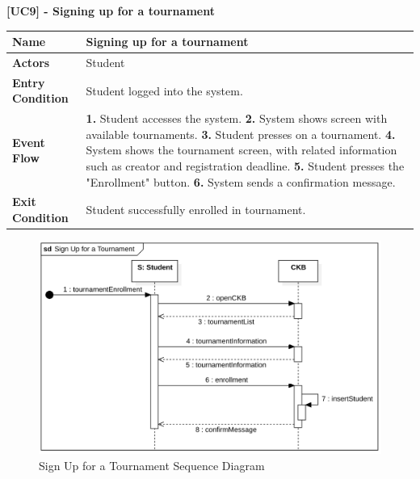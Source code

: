 \clearpage

\raggedright
\textbf{[UC9] - Signing up for a tournament}
\begin{table}[h]
\begin{tabular}{|l|p{12cm}|} \hline 

\rule[-3mm]{0mm}{1cm}
\textbf{Name} & Signing up for a tournament \\ \hline 

\rule[-3mm]{0mm}{1cm}
\textbf{Actors} & Student \\ \hline 

\rule[-3mm]{0mm}{1cm}
\textbf{Entry Condition} & Student logged into the system.
\vspace{2pt}
\\ \hline 

\rule[-3mm]{0mm}{1cm}
\textbf{Event Flow} & 
\textbf{1.} Student accesses the system.
\vspace{4pt}
\newline
\textbf{2.} System shows screen with available tournaments.
\vspace{4pt}
\newline
\textbf{3.} Student presses on a tournament.
\vspace{4pt}
\newline
\textbf{4.} System shows the tournament screen, with related information such as creator and registration deadline.
\vspace{4pt}
\newline
\textbf{5.} Student presses the "Enrollment" button.
\vspace{4pt}
\newline
\textbf{6.} System sends a confirmation message.

\\ \hline 

\rule[-3mm]{0mm}{1cm}
\textbf{Exit Condition} & Student successfully enrolled in tournament. \\ \hline

\end{tabular}
\end{table}

\begin{figure}[h]
    \centering
    \includegraphics[scale=0.6]{images/SD/SignUpTournamentSD.png} 
    \caption{Sign Up for a Tournament Sequence Diagram}
    \label{fig_SignUpTournamentSD}
\end{figure}


